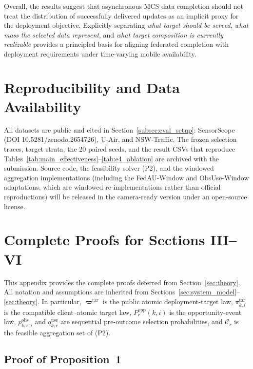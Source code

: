 \documentclass[letterpaper,journal]{IEEEtran}
\begin{document}
Overall, the results suggest that asynchronous MCS data completion should not
treat the distribution of successfully delivered updates as an implicit proxy
for the deployment objective.  Explicitly separating \emph{what target should
be served}, \emph{what mass the selected data represent}, and \emph{what target
composition is currently realizable} provides a principled basis for aligning
federated completion with deployment requirements under time-varying mobile
availability.

\section{Reproducibility and Data Availability}

All datasets are public and cited in
Section~\ref{subsec:eval_setup}: SensorScope
(DOI 10.5281/zenodo.2654726), U-Air, and NSW-Traffic.  The frozen selection
traces, target strata, the 20 paired seeds, and the result CSVs that reproduce
Tables~\ref{tab:main_effectiveness}--\ref{tab:e4_ablation} are archived with the
submission.  Source code, the feasibility solver (P2), and the windowed
aggregation implementations (including the FedAU-Window and ObsUse-Window
adaptations, which are windowed re-implementations rather than official
reproductions) will be released in the camera-ready version under an open-source license.

\appendices
\section{Complete Proofs for Sections III--VI}
\label{app:complete_proofs}

This appendix provides the complete proofs deferred from
Section~\ref{sec:theory}.  All notation and assumptions are inherited from
Sections~\ref{sec:system_model}--\ref{sec:theory}.  In particular,
$\boldsymbol\varpi^{\mathrm{tar}}$ is the public atomic deployment-target law,
$\pi^{\mathrm{tar}}_{k,i}$ is the compatible client--atomic target law,
$P_r^{\mathrm{opp}}(k,i)$ is the opportunity-event law,
$p^{\mathrm{obs}}_{k,r,i}$ and $q^{\mathrm{use}}_{k,r}$ are sequential
pre-outcome selection probabilities, and $\mathcal{C}_r$ is the feasible
aggregation set of (P2).

\subsection{Proof of Proposition~1}
\label{app:proof_prop1}
\end{document}
